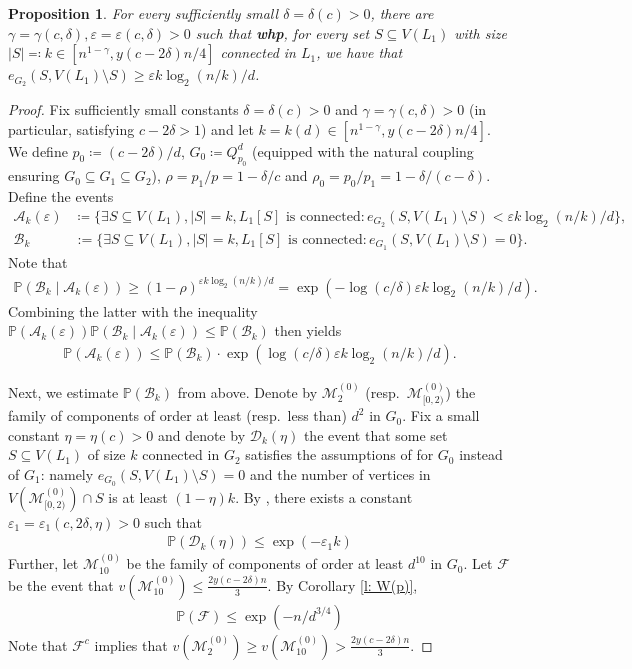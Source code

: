 \documentclass[reqno,final,a4paper]{amsart}
\newtheorem{proposition}[thm]{Proposition}
\theoremstyle{definition}
\newcommand{\cA}{\mathcal{A}}
\newcommand{\cB}{\mathcal{B}}
\newcommand{\cD}{\mathcal{D}}
\newcommand{\cF}{\mathcal{F}}
\newcommand{\cM}{\mathcal{M}}
\def\eps{\varepsilon}
\newcommand{\1}{\mathbbm{1}}
\begin{document}
\begin{proposition}\label{prop: expansion}
For every sufficiently small $\delta = \delta(c) > 0$, there are $\gamma = \gamma(c,\delta),\eps = \eps(c,\delta)>0$ such that \textbf{whp}, for every set $S\subseteq V(L_1)$ with size $|S|\eqqcolon  k\in [n^{1-\gamma},y(c-2\delta)n/4]$ connected in $L_1$, we have that $e_{G_2}(S,V(L_1)\setminus S)\ge \eps k\log_2(n/k)/d$.
\end{proposition}
\begin{proof}
Fix sufficiently small constants $\delta = \delta(c) > 0$ and $\gamma = \gamma(c,\delta) > 0$ (in particular, satisfying $c-2\delta>1$) and let $k = k(d)\in [n^{1-\gamma},y(c-2\delta)n/4]$. 
We define $p_0\coloneqq(c-2\delta)/d$, $G_0\coloneqq Q^d_{p_0}$ (equipped with the natural coupling ensuring $G_0\subseteq G_1\subseteq G_2$), $\rho = p_1/p=1-\delta/c$ and $\rho_0=p_0/p_1 = 1-\delta/(c-\delta)$. 
Define the events
\begin{align*}
    \cA_k(\eps)&\coloneqq\{\exists S\subseteq V(L_1), |S|=k, L_1[S] \text{ is connected}: e_{G_2}(S,V(L_1)\setminus S)<\eps k\log_2(n/k)/d\},\\
    \cB_k &:= \{\exists S\subseteq V(L_1), |S|=k, L_1[S] \text{ is connected}: e_{G_1}(S,V(L_1)\setminus S)=0\}.
\end{align*}
Note that
\begin{align*}
    \mathbb{P}(\cB_k\mid \cA_k(\eps))\ge (1-\rho)^{\eps k\log_2(n/k)/d}=\exp\left(-\log(c/\delta)\eps k\log_2(n/k)/d\right).
\end{align*}
Combining the latter with the inequality $\mathbb{P}(\cA_k(\eps)) \mathbb{P}(\cB_k\mid \cA_k(\eps))\le \mathbb{P}(\cB_k)$ then yields
\begin{align}
\mathbb{P}(\cA_k(\eps)) \le \mathbb{P}(\cB_k)\cdot \exp\left(\log(c/\delta)\eps k\log_2(n/k)/d\right).\label{eq: estimate on Akeps}
\end{align}

Next, we estimate $\mathbb{P}(\cB_k)$ from above. Denote by $\cM_2^{(0)}$ (resp.\ $\cM_{[0,2)}^{(0)}$) the family of components of order at least (resp.\ less than) $d^2$ in $G_0$.
Fix a small constant $\eta = \eta(c)>0$ and denote by $\cD_k(\eta)$ the event that some set $S\subseteq V(L_1)$ of size $k$ connected in $G_2$ satisfies the assumptions of  for $G_0$ instead of $G_1$: 
namely $e_{G_0}(S,V(L_1)\setminus S)=0$ and the number of vertices in $V(\cM_{[0,2)}^{(0)})\cap S$ is at least $(1-\eta)k$.
By , there exists a constant $\eps_1 = \eps_1(c,2\delta,\eta)>0$ such that 
\begin{align}
\mathbb{P}(\cD_k(\eta))\le \exp(-\eps_1k)\label{eq: cd_k_eta}    
\end{align}
Further, let $\cM_{10}^{(0)}$ be the family of components of order at least $d^{10}$ in $G_0$. Let $\cF$ be the event that $v(\cM_{10}^{(0)})\le \frac{2y(c-2\delta)n}{3}$. By Corollary \ref{l: W(p)}, 
\begin{align}
\mathbb{P}\left(\cF\right)\le \exp\left(-n/d^{3/4}\right)\label{eq: cf 3/4}    
\end{align}
Note that $\cF^c$ implies that $v(\cM_{2}^{(0)})\ge v(\cM_{10}^{(0)})>\frac{2y(c-2\delta)n}{3}$.


\end{proof}
\end{document}
